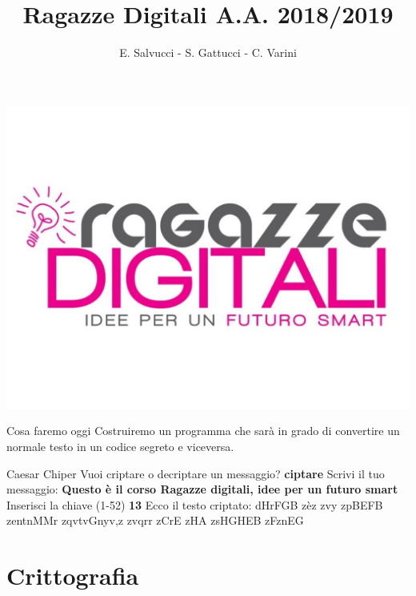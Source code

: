 \documentclass{beamer}
\title[Ragazze Digitali 2019]{Ragazze Digitali A.A. 2018/2019}
\author{E. Salvucci - S. Gattucci - C. Varini}
\date{}
\begin{document}
{\includegraphics[width=\paperwidth,height=\paperheight]{images/ragazze_digitali.jpg}}
\begin{frame}
\end{frame}


\begin{frame}{Cosa faremo oggi}
    \vspace{0.8cm}
      Costruiremo un programma che sarà in grado di convertire un normale testo in un codice segreto e viceversa.
\end{frame}

\begin{frame}{Caesar Chiper}
    Vuoi criptare o decriptare un messaggio?\newline
    \textbf{ciptare}\newline
    Scrivi il tuo messaggio:\newline
    \textbf{Questo è il corso Ragazze digitali, idee per un futuro smart}\newline
    Inserisci la chiave (1-52)\newline
    \textbf{13}\newline
    Ecco il testo criptato:\newline
    dHrFGB zèz zvy zpBEFB zentnMMr zqvtvGnyv,z zvqrr zCrE zHA zsHGHEB zFznEG
\end{frame}

\section{Crittografia}
\end{document}
